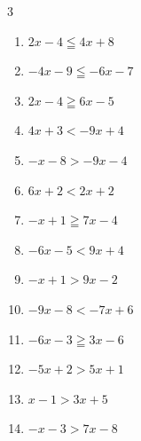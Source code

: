 \begin{multicols}{3}
\begin{enumerate}
  \item $2x-4\leqq 4x+8$

        \phantom{$\displaystyle x\geqq -6$}

  \item $-4x-9\leqq -6x-7$

        \phantom{$\displaystyle x\leqq 1$}

\columnbreak %

\resetques

  \item $2x-4\geqq 6x-5$


  \item $4x+3<-9x+4$


  \item $-x-8>-9x-4$


  \item $6x+2<2x+2$

        \phantom{$\displaystyle x<0$}

  \item $-x+1\geqq 7x-4$


  \item $-6x-5<9x+4$


  \item $-x+1>9x-2$


  \item $-9x-8<-7x+6$

        \phantom{$\displaystyle x>-7$}

  \item $-6x-3\geqq 3x-6$


  \item $-5x+2>5x+1$


  \item $x-1>3x+5$

        \phantom{$\displaystyle x<-3$}

  \item $-x-3>7x-8$


\end{enumerate}
\end{multicols}
